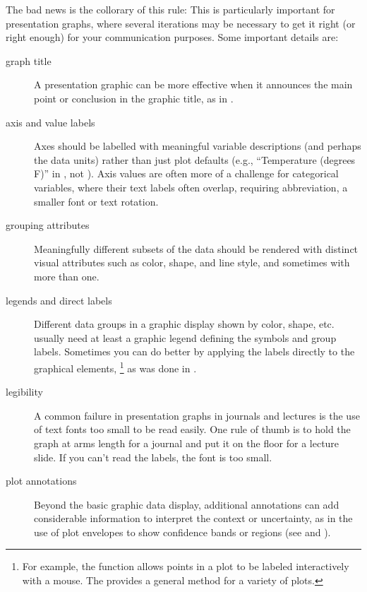\documentclass[11pt]{book}
\begin{document}
The bad news is the collorary of this rule:
This is particularly important for presentation graphs, where several iterations
may be necessary to get it right (or right enough) for your communication purposes.
Some important details are:
\begin{description}

\item[graph title] A presentation graphic can be more effective when it announces
 the main point or conclusion in the graphic title, as in .

\item[axis and value labels] Axes should be labelled with meaningful variable descriptions
 (and perhaps the data units) rather than just plot defaults (e.g., ``Temperature (degrees F)''
 in , not ).
 Axis values are often more of a challenge for categorical variables, where their text
 labels often overlap, requiring abbreviation, a smaller font or text rotation.

\item[grouping attributes] Meaningfully different subsets of the data should be
 rendered with distinct visual attributes such as color, shape, and line style,
 and sometimes with more than one.  
 
 \item[legends and direct labels] Different data groups in a graphic display 
 shown by color, shape, etc.  usually need at least a graphic legend defining
 the symbols and group labels. Sometimes you can do better by applying the
 labels directly to the graphical elements,%
 \footnote{
 For example, the  function allows points in a plot to be labeled
 interactively with a mouse.  The  provides a general
 method for a variety of plots.
 }
 as was done in .
 
 \item[legibility] A common failure in presentation graphs in journals
 and lectures is the use of text fonts too small to be read easily.
 One rule of thumb is to hold the graph at arms length for a journal
 and put it on the floor for a lecture slide.  If you can't read the
 labels, the font is too small.
 
 \item [plot annotations] Beyond the basic graphic data display, additional
 annotations can add considerable information to interpret the context
 or uncertainty, as in the use of plot envelopes to show confidence bands
 or regions (see  and ).
 

\end{description}
\end{document}
